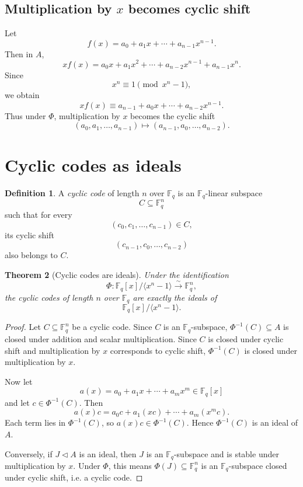 \documentclass[11pt]{article}
\newtheorem{theorem}{Theorem}[section]
\theoremstyle{definition}
\newtheorem{definition}[theorem]{Definition}
\newcommand{\F}{\mathbb{F}}
\newcommand{\ideal}[1]{\langle #1\rangle}
\begin{document}
	\subsection{Multiplication by \(x\) becomes cyclic shift}
	
	Let
	\[
	f(x)=a_0+a_1x+\cdots+a_{n-1}x^{n-1}.
	\]
	Then in \(A\),
	\[
	x f(x)
	=
	a_0x+a_1x^2+\cdots+a_{n-2}x^{n-1}+a_{n-1}x^n.
	\]
	Since
	\[
	x^n\equiv 1\pmod{x^n-1},
	\]
	we obtain
	\[
	x f(x)\equiv a_{n-1}+a_0x+\cdots+a_{n-2}x^{n-1}.
	\]
	Thus under \(\Phi\), multiplication by \(x\) becomes the cyclic shift
	\[
	(a_0,a_1,\dots,a_{n-1})
	\longmapsto
	(a_{n-1},a_0,\dots,a_{n-2}).
	\]
	
	\section{Cyclic codes as ideals}
	
	\begin{definition}
		A \emph{cyclic code} of length \(n\) over \(\F_q\) is an \(\F_q\)-linear subspace
		\[
		C\subseteq \F_q^n
		\]
		such that for every
		\[
		(c_0,c_1,\dots,c_{n-1})\in C,
		\]
		its cyclic shift
		\[
		(c_{n-1},c_0,\dots,c_{n-2})
		\]
		also belongs to \(C\).
	\end{definition}
	
	\begin{theorem}[Cyclic codes are ideals]\label{thm:cyclic-codes-ideals}
		Under the identification
		\[
		\Phi:\F_q[x]/\ideal{x^n-1}\xrightarrow{\sim}\F_q^n,
		\]
		the cyclic codes of length \(n\) over \(\F_q\) are exactly the ideals of
		\[
		\F_q[x]/\ideal{x^n-1}.
		\]
	\end{theorem}
	
	\begin{proof}
		Let \(C\subseteq \F_q^n\) be a cyclic code. Since \(C\) is an \(\F_q\)-subspace, \(\Phi^{-1}(C)\subseteq A\) is closed under addition and scalar multiplication. Since \(C\) is closed under cyclic shift and multiplication by \(x\) corresponds to cyclic shift, \(\Phi^{-1}(C)\) is closed under multiplication by \(x\).
		
		Now let
		\[
		a(x)=a_0+a_1x+\cdots+a_mx^m\in \F_q[x]
		\]
		and let \(c\in \Phi^{-1}(C)\). Then
		\[
		a(x)c
		=
		a_0c+a_1(xc)+\cdots+a_m(x^mc).
		\]
		Each term lies in \(\Phi^{-1}(C)\), so \(a(x)c\in \Phi^{-1}(C)\). Hence \(\Phi^{-1}(C)\) is an ideal of \(A\).
		
		Conversely, if \(J\triangleleft A\) is an ideal, then \(J\) is an \(\F_q\)-subspace and is stable under multiplication by \(x\). Under \(\Phi\), this means \(\Phi(J)\subseteq \F_q^n\) is an \(\F_q\)-subspace closed under cyclic shift, i.e. a cyclic code.
	\end{proof}
	
\end{document}
